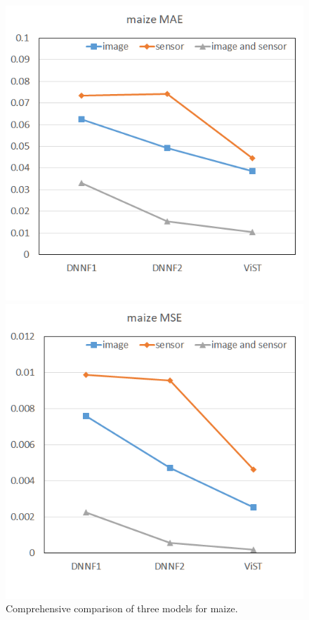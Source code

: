 \documentclass[acmsmall,manuscript, screen, review]{acmart}
\begin{document}
\begin{figure}[htbp]
  \centering
  \begin{minipage}{0.49\linewidth}
    \centering
    \includegraphics[width=\linewidth]{pic/comprehensive_corn_mae.png}
  \end{minipage}
  \centering
  \begin{minipage}{0.49\linewidth}
    \centering
    \includegraphics[width=\linewidth]{pic/comprehensive_corn_mse.png}
  \end{minipage}

  \caption{Comprehensive comparison of three models for maize. \label{comprehensive_maize}}
\end{figure}
\end{document}
